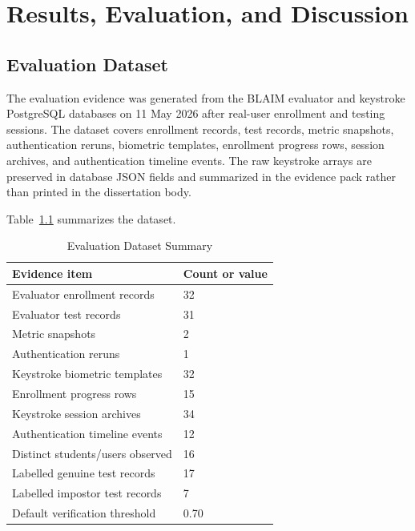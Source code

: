 \chapter{Results, Evaluation, and Discussion}
\label{chap:results}

\section{Evaluation Dataset}
\label{sec:evaluation-dataset}

The evaluation evidence was generated from the BLAIM evaluator and keystroke PostgreSQL databases on 11 May 2026 after real-user enrollment and testing sessions. The dataset covers enrollment records, test records, metric snapshots, authentication reruns, biometric templates, enrollment progress rows, session archives, and authentication timeline events. The raw keystroke arrays are preserved in database JSON fields and summarized in the evidence pack rather than printed in the dissertation body.

Table~\ref{tab:evaluation-summary} summarizes the dataset.

\begin{table}[H]
  \centering
  \caption{Evaluation Dataset Summary}
  \label{tab:evaluation-summary}
  \begin{singlespace}
  \begin{tabularx}{\textwidth}{@{}p{8.8cm}p{3.0cm}@{}}
    \toprule
    \textbf{Evidence item} & \textbf{Count or value} \\
    \midrule
    Evaluator enrollment records & 32 \\
    Evaluator test records & 31 \\
    Metric snapshots & 2 \\
    Authentication reruns & 1 \\
    Keystroke biometric templates & 32 \\
    Enrollment progress rows & 15 \\
    Keystroke session archives & 34 \\
    Authentication timeline events & 12 \\
    Distinct students/users observed & 16 \\
    Labelled genuine test records & 17 \\
    Labelled impostor test records & 7 \\
    Default verification threshold & 0.70 \\
    \bottomrule
  \end{tabularx}
  \end{singlespace}
\end{table}

